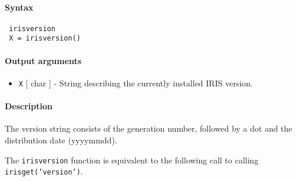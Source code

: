 


	\paragraph{Syntax}
 
 \begin{verbatim}
 irisversion
 X = irisversion()
 \end{verbatim}
 
 \paragraph{Output arguments}
 
 \begin{itemize}
 \item
   \texttt{X} {[} char {]} - String describing the currently installed
   IRIS version.
 \end{itemize}
 
 \paragraph{Description}
 
 The version string consists of the generation number, followed by a dot
 and the distribution date (yyyymmdd).
 
 The \texttt{irisversion} function is equivalent to the following call to
 calling \texttt{irisget('version')}.


